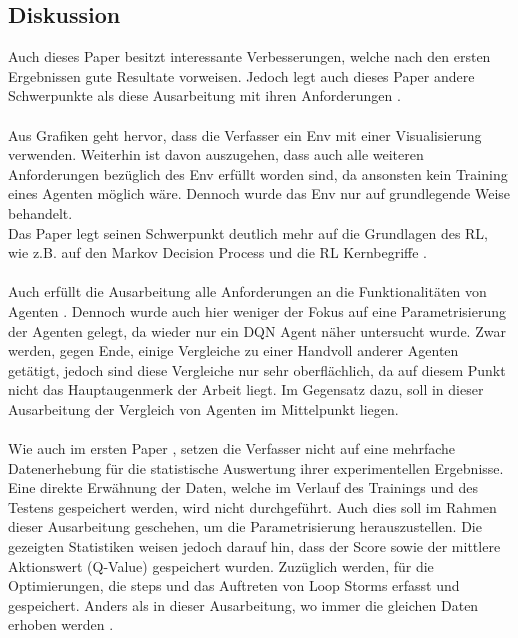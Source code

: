 \subsection{Diskussion}\label{subsec:Verwandte_Arbeiten_Paper_2_Diskussion}
Auch dieses Paper besitzt interessante Verbesserungen, welche nach den ersten Ergebnissen gute Resultate vorweisen. Jedoch legt auch dieses Paper andere Schwerpunkte als diese Ausarbeitung mit ihren Anforderungen .\\
\\Aus Grafiken geht hervor, dass die Verfasser ein Env mit einer Visualisierung verwenden. Weiterhin ist davon auszugehen, dass auch alle weiteren Anforderungen bezüglich des Env  erfüllt worden sind, da ansonsten kein Training eines Agenten möglich wäre. Dennoch wurde das Env nur auf grundlegende Weise behandelt.\\
Das Paper legt seinen Schwerpunkt deutlich mehr auf die Grundlagen des RL, wie z.B. auf den Markov Decision Process und die RL Kernbegriffe .\\
\\Auch erfüllt die Ausarbeitung alle Anforderungen an die Funktionalitäten von Agenten . Dennoch wurde auch hier weniger der Fokus auf eine Parametrisierung der Agenten gelegt, da wieder nur ein DQN Agent näher untersucht wurde. Zwar werden, gegen Ende, einige Vergleiche zu einer Handvoll anderer Agenten getätigt, jedoch sind diese Vergleiche nur sehr oberflächlich, da auf diesem Punkt nicht das Hauptaugenmerk der Arbeit liegt. 
Im Gegensatz dazu, soll in dieser Ausarbeitung der Vergleich von Agenten im Mittelpunkt liegen.\\
\\Wie auch im ersten Paper , setzen die Verfasser nicht auf eine mehrfache Datenerhebung für die statistische Auswertung ihrer experimentellen Ergebnisse.
Eine direkte Erwähnung der Daten, welche im Verlauf des Trainings und des Testens gespeichert werden, wird nicht durchgeführt. Auch dies soll im Rahmen dieser Ausarbeitung geschehen, um die Parametrisierung  herauszustellen.  
Die gezeigten Statistiken weisen jedoch darauf hin, dass der Score sowie der mittlere Aktionswert (Q-Value) gespeichert wurden. Zuzüglich werden, für die Optimierungen, die steps und das Auftreten von Loop Storms erfasst und gespeichert. Anders als in dieser Ausarbeitung, wo immer die gleichen Daten erhoben werden .\\
